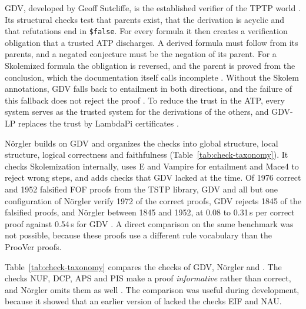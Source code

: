 GDV, developed by Geoff Sutcliffe, is the established verifier of the TPTP world \citep{Sutcliffe2006GDV,GDVSeminar}.
Its structural checks test that parents exist, that the derivation is acyclic and that refutations end in \texttt{\$false}.
For every formula it then creates a verification obligation that a trusted ATP discharges. A derived formula must follow from its parents, and a negated conjecture must be the negation of its parent.
For a Skolemized formula the obligation is reversed, and the parent is proved from the conclusion, which the documentation itself calls incomplete \citep{GDVSeminar}.
Without the Skolem annotations, GDV falls back to entailment in both directions, and the failure of this fallback does not reject the proof \citep{taprogge2026lightweight}.
To reduce the trust in the ATP, every system serves as the trusted system for the derivations of the others, and GDV-LP replaces the trust by LambdaPi certificates \citep{GDVSeminar,Sutcliffe2025GDVLP}.

N\"orgler \citep{taprogge2026lightweight} builds on GDV and organizes the checks into global structure, local structure, logical correctness and faithfulness (Table~\ref{tab:check-taxonomy}).
It checks Skolemization internally, uses E and Vampire for entailment and Mace4 to reject wrong steps, and adds checks that GDV lacked at the time.
Of 1976 correct and 1952 falsified FOF proofs from the TSTP library, GDV and all but one configuration of N\"orgler verify 1972 of the correct proofs, GDV rejects 1845 of the falsified proofs, and N\"orgler between 1845 and 1952, at 0.08 to 0.31\,s per correct proof against 0.54\,s for GDV \citep{taprogge2026lightweight}.
A direct comparison on the same benchmark was not possible, because these proofs use a different rule vocabulary than the ProoVer proofs.

Table~\ref{tab:check-taxonomy} compares the checks of GDV, N\"orgler and \TSTPy{}.
The checks NUF, DCP, APS and PIS make a proof \emph{informative} rather than correct, and N\"orgler omits them as well \citep{taprogge2026lightweight}.
The comparison was useful during development, because it showed that an earlier version of \TSTPy{} lacked the checks EIF and NAU.

